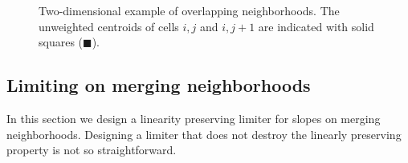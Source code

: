 \begin{figure}
	\hfill
	\caption{Two-dimensional example of overlapping neighborhoods.  The unweighted centroids of cells $i,j$ and $i,j+1$ are indicated with solid squares ($\blacksquare$).} \label{fig:2nborTile}
\end{figure}


\subsection{Limiting on merging neighborhoods}
In this section we design a linearity preserving limiter for slopes on merging neighborhoods.  Designing a limiter that does not destroy the linearly preserving property is not so straightforward.  
